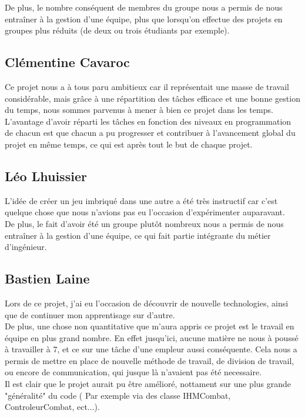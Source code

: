             De plus, le nombre conséquent de membres du groupe nous a permis de nous entraîner à la gestion d'une équipe, plus que lorsqu'on effectue des projets en groupes plus réduits (de deux ou trois étudiants par exemple).
        \subsection{Clémentine Cavaroc}
            Ce projet nous a à tous paru ambitieux car il représentait une masse de travail considérable, mais grâce à une répartition des tâches efficace et une bonne gestion du temps, nous sommes parvenus à mener à bien ce projet dans les temps. \\

            L'avantage d'avoir réparti les tâches en fonction des niveaux en programmation de chacun est que chacun a pu progresser et contribuer à l'avancement global du projet en même temps, ce qui est après tout le but de chaque projet.
        \subsection{Léo Lhuissier}
            L'idée de créer un jeu imbriqué dans une autre a été très instructif car c'est quelque chose que nous n'avions pas eu l'occasion d'expérimenter auparavant. \\

            De plus, le fait d'avoir été un groupe plutôt nombreux nous a permis de nous entraîner à la gestion d'une équipe, ce qui fait partie intégrante du métier d'ingénieur.
        \subsection{Bastien Laine}
            Lors de ce projet, j'ai eu l'occasion de découvrir de nouvelle technologies, ainsi que de continuer mon apprentisage sur d'autre. \\

            De plus, une chose non quantitative que m'aura appris ce projet est le travail en équipe en plus grand nombre. En effet jusqu'ici, aucune matière ne nous à poussé à travailler à 7, et ce sur une tâche d'une empleur aussi conséquente. Cela nous a permis de mettre en place de nouvelle méthode de travail, de division de travail, ou encore de communication, qui jusque là n'avaient pas été necessaire. \\

            Il est clair que le projet aurait pu être amélioré, nottament sur une plus grande "généralité" du code ( Par exemple via des classe IHMCombat, ControleurCombat, ect...). \\

